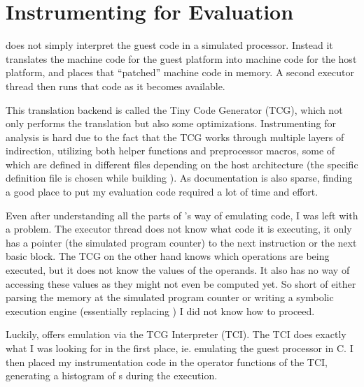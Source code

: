 \section{Instrumenting \qemu{} for Evaluation}
\label{evaluation}
\qemu{} does not simply interpret the guest code in a simulated processor.
Instead it translates the machine code for the guest platform into machine code for the host platform, and places that ``patched'' machine code in memory.
A second executor thread then runs that code as it becomes available.

This translation backend is called the Tiny Code Generator (TCG), which not only performs the translation but also some optimizations.
Instrumenting \qemu{} for analysis is hard due to the fact that the TCG works through multiple layers of indirection, utilizing both helper functions and preprocessor macros, some of which are defined in different files depending on the host architecture (the specific definition file is chosen while building \qemu{}).
As documentation is also sparse, finding a good place to put my evaluation code required a lot of time and effort.

Even after understanding all the parts of \qemu{}'s way of emulating code, I was left with a problem.
The executor thread does not know what code it is executing, it only has a pointer (the simulated program counter) to the next instruction or the next basic block.
The TCG on the other hand knows which operations are being executed, but it does not know the values of the operands.
It also has no way of accessing these values as they might not even be computed yet.
So short of either parsing the memory at the simulated program counter or writing a symbolic execution engine (essentially replacing \qemu{}) I did not know how to proceed.

Luckily, \qemu{} offers emulation via the TCG Interpreter (TCI).
The TCI does exactly what I was looking for in the first place, ie. emulating the guest processor in C.
I then placed my instrumentation code in the operator functions of the TCI, generating a histogram of \hammingw{}s during the execution.
